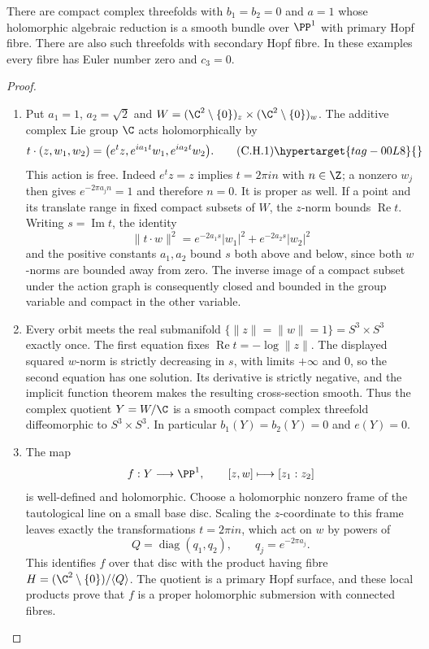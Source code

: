 \begin{proposition}\hypertarget{tag-01FC}{}\label{cdp:st:C.3.6}


There are compact complex threefolds with $b_1=b_2=0$ and $a=1$
whose holomorphic algebraic reduction is a smooth bundle over
$\PP^1$ with primary Hopf fibre. There are also such threefolds
with secondary Hopf fibre. In these examples every fibre has Euler
number zero and $c_3=0$.
\end{proposition}


\begin{proof}

\begin{enumerate}[label=\arabic*.,leftmargin=*]
\item Put $a_1=1$, $a_2=\sqrt2$ and
$W=(\C^2\setminus\{0\})_z\times(\C^2\setminus\{0\})_w$.
The additive complex Lie group $\C$ acts holomorphically by
\[
t\cdot(z,w_1,w_2)
 =\bigl(e^t z,e^{ia_1t}w_1,e^{ia_2t}w_2\bigr).
\tag{C.H.1}\hypertarget{tag-00L8}{}\label{cdp:eq:C.H.1}
\]
This action is free. Indeed $e^t z=z$ implies $t=2\pi in$ with
$n\in\Z$; a nonzero $w_j$ then gives $e^{-2\pi a_jn}=1$ and
therefore $n=0$. It is proper as well. If a point and its translate
range in fixed compact subsets of $W$, the $z$-norm bounds
$\operatorname{Re}t$. Writing $s=\operatorname{Im}t$, the identity
\[
\|t\cdot w\|^2
 =e^{-2a_1s}|w_1|^2+e^{-2a_2s}|w_2|^2
\]
and the positive constants $a_1,a_2$ bound $s$ both above and
below, since both $w$-norms are bounded away from zero. The inverse
image of a compact subset under the action graph is consequently
closed and bounded in the group variable and compact in the other
variable.

\item Every orbit meets the real submanifold
$\{\|z\|=\|w\|=1\}=S^3\times S^3$ exactly once.
The first equation fixes $\operatorname{Re}t=-\log\|z\|$.
The displayed squared $w$-norm is strictly decreasing in $s$,
with limits $+\infty$ and $0$, so the second equation has one
solution. Its derivative is strictly negative, and the implicit
function theorem makes the resulting cross-section smooth.
Thus the complex quotient $Y=W/\C$ is a smooth compact complex
threefold diffeomorphic to $S^3\times S^3$. In particular
$b_1(Y)=b_2(Y)=0$ and $e(Y)=0$.

\item The map
\[
f:Y\longrightarrow\PP^1,\qquad [z,w]\longmapsto[z_1:z_2]
\]
is well-defined and holomorphic. Choose a holomorphic nonzero
frame of the tautological line on a small base disc. Scaling the
$z$-coordinate to this frame leaves exactly the transformations
$t=2\pi in$, which act on $w$ by powers of
\[
Q=\operatorname{diag}(q_1,q_2),\qquad
q_j=e^{-2\pi a_j}.
\]
This identifies $f$ over that disc with the product having fibre
$H=(\C^2\setminus\{0\})/\langle Q\rangle$.
The quotient is a primary Hopf surface, and these local products
prove that $f$ is a proper holomorphic submersion with connected
fibres.


\end{enumerate}
\end{proof}

